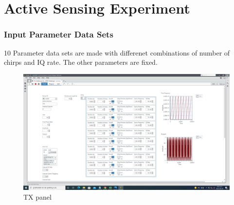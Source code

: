\section{Active Sensing Experiment}
    \subsubsection*{Input Parameter Data Sets}
    10 Parameter data sets are made with differenet combinations of number of chirps and IQ rate. The other parameters are fixed. \\
    \vspace{-4mm}  
    \begin{figure}[!h]\centering
    \hspace{15mm}
		\includegraphics[width=.78\textwidth]{image/week04/1-1-b.png}
		\caption{\footnotesize TX panel}
		\vspace{-10pt}
    \end{figure}
    
